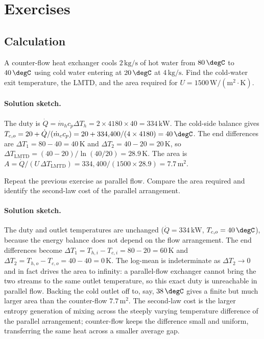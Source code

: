 \section{Exercises}

\subsection*{Calculation}

\begin{exercise}
A counter-flow heat exchanger cools $2\,\text{kg/s}$ of hot water
from $80\,\degC$ to $40\,\degC$ using cold water entering at $20\,
\degC$ at $4\,\text{kg/s}$. Find the cold-water exit temperature, the
LMTD, and the area required for $U = 1500\,\text{W}/(\text{m}^2\cdot
\si{\kelvin})$.

\paragraph{Solution sketch.} The duty is $\dot{Q} = \dot{m}_h c_p \Delta
T_h = 2 \times 4180 \times 40 = 334\,\text{kW}$. The cold-side balance
gives $T_{c,o} = 20 + \dot{Q}/(\dot{m}_c c_p) = 20 + 334{,}400/(4
\times 4180) = 40\,\degC$. The end differences are $\Delta T_1 = 80 -
40 = 40\,\si{\kelvin}$ and $\Delta T_2 = 40 - 20 = 20\,\si{\kelvin}$,
so $\Delta T_{\text{LMTD}} = (40 - 20)/\ln(40/20) = 28.9\,\si{\kelvin}$.
The area is $A = \dot{Q}/(U\,\Delta T_{\text{LMTD}}) = 334{,}400/(1500
\times 28.9) = 7.7\,\text{m}^2$.
\end{exercise}

\begin{exercise}
Repeat the previous exercise as parallel flow. Compare the area
required and identify the second-law cost of the parallel arrangement.

\paragraph{Solution sketch.} The duty and outlet temperatures are
unchanged ($\dot{Q} = 334\,\text{kW}$, $T_{c,o} = 40\,\degC$), because
the energy balance does not depend on the flow arrangement. The end
differences become $\Delta T_1 = T_{h,i} - T_{c,i} = 80 - 20 = 60\,
\si{\kelvin}$ and $\Delta T_2 = T_{h,o} - T_{c,o} = 40 - 40 = 0\,
\si{\kelvin}$. The log-mean is indeterminate as $\Delta T_2 \to 0$ and
in fact drives the area to infinity: a parallel-flow exchanger cannot
bring the two streams to the same outlet temperature, so this exact
duty is unreachable in parallel flow. Backing the cold outlet off to,
say, $38\,\degC$ gives a finite but much larger area than the
counter-flow $7.7\,\text{m}^2$. The second-law cost is the larger
entropy generation of mixing across the steeply varying temperature
difference of the parallel arrangement; counter-flow keeps the
difference small and uniform, transferring the same heat across a
smaller average gap.
\end{exercise}

